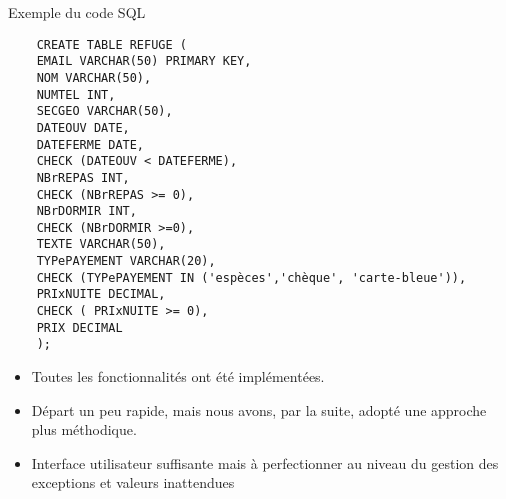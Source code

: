 \documentclass{beamer}
\begin{document}
\begin{frame}[fragile]{Exemple du code SQL}
  \begin{verbatim}
    CREATE TABLE REFUGE (
    EMAIL VARCHAR(50) PRIMARY KEY,
    NOM VARCHAR(50),
    NUMTEL INT,
    SECGEO VARCHAR(50),
    DATEOUV DATE,
    DATEFERME DATE,
    CHECK (DATEOUV < DATEFERME),
    NBrREPAS INT,
    CHECK (NBrREPAS >= 0),
    NBrDORMIR INT,
    CHECK (NBrDORMIR >=0),
    TEXTE VARCHAR(50),
    TYPePAYEMENT VARCHAR(20),
    CHECK (TYPePAYEMENT IN ('espèces','chèque', 'carte-bleue')),
    PRIxNUITE DECIMAL,
    CHECK ( PRIxNUITE >= 0),
    PRIX DECIMAL
    );
  \end{verbatim}
\end{frame}

\begin{frame}
  \begin{itemize}
  \item Toutes les fonctionnalités ont été implémentées.
  \item Départ un peu rapide, mais nous avons, par la suite, adopté une approche plus méthodique.
  \item Interface utilisateur suffisante mais à perfectionner au niveau du gestion des exceptions et valeurs inattendues
  \end{itemize}
\end{frame}
\end{document}
